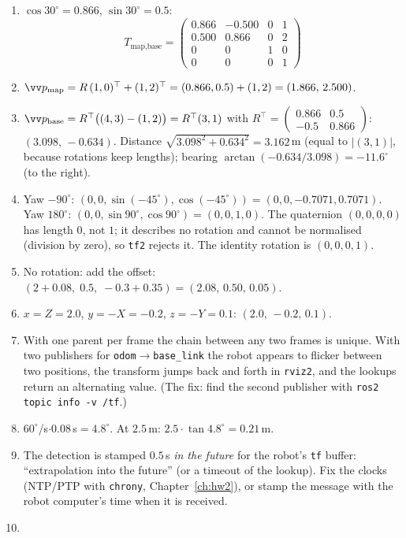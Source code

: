 \begin{enumerate}[label=\textbf{\ansnum.\arabic*}]
  \item $\cos30^\circ=0.866$, $\sin30^\circ=0.5$:
  \[T_\text{map,base}=\begin{pmatrix}0.866&-0.500&0&1\\0.500&0.866&0&2\\0&0&1&0\\0&0&0&1\end{pmatrix}\]
  \item $\vv p_\text{map}=R\,(1,0)^\top+(1,2)^\top=(0.866,0.5)+(1,2)=(1.866,\,2.500)$.
  \item $\vv p_\text{base}=R^\top\big((4,3)-(1,2)\big)=R^\top(3,1)$ with $R^\top=\begin{pmatrix}0.866&0.5\\-0.5&0.866\end{pmatrix}$: $(3.098,\,-0.634)$. Distance $\sqrt{3.098^2+0.634^2}=3.162$\,m (equal to $|(3,1)|$, because rotations keep lengths); bearing $\arctan(-0.634/3.098)=-11.6^\circ$ (to the right).
  \item Yaw $-90^\circ$: $(0,0,\sin(-45^\circ),\cos(-45^\circ))=(0,0,-0.7071,0.7071)$. Yaw $180^\circ$: $(0,0,\sin90^\circ,\cos90^\circ)=(0,0,1,0)$. The quaternion $(0,0,0,0)$ has length $0$, not $1$; it describes no rotation and cannot be normalised (division by zero), so \verb!tf2! rejects it. The identity rotation is $(0,0,0,1)$.
  \item No rotation: add the offset: $(2+0.08,\;0.5,\;-0.3+0.35)=(2.08,\,0.50,\,0.05)$.
  \item $x=Z=2.0$, $y=-X=-0.2$, $z=-Y=0.1$: $(2.0,\,-0.2,\,0.1)$.
  \item With one parent per frame the chain between any two frames is unique. With two publishers for \verb!odom!$\to$\verb!base_link! the robot appears to flicker between two positions, the transform jumps back and forth in \verb!rviz2!, and the lookups return an alternating value. (The fix: find the second publisher with \verb!ros2 topic info -v /tf!.)
  \item $60^\circ$/s$\cdot0.08$\,s$=4.8^\circ$. At $2.5$\,m: $2.5\cdot\tan4.8^\circ=0.21$\,m.
  \item The detection is stamped $0.5$\,s \emph{in the future} for the robot's \verb!tf! buffer: ``extrapolation into the future'' (or a timeout of the lookup). Fix the clocks (NTP/PTP with \verb!chrony!, Chapter~\ref{ch:hw2}), or stamp the message with the robot computer's time when it is received.
  \item[\textbf{\ansnum.10}]

\end{enumerate}
